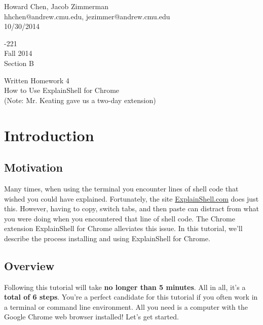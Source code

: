 \documentclass[11pt]{article}
\begin{document}
\thispagestyle{empty}
\noindent
\begin{minipage}[width=0.7\linewidth]{0.7\linewidth}
  Howard Chen, Jacob Zimmerman\\
  hhchen@andrew.cmu.edu, jezimmer@andrew.cmu.edu\\
  10/30/2014
\end{minipage}
\hfill
\begin{minipage}[width=0.3\linewidth]{0.3\linewidth}
  -221\\
  Fall 2014\\
  Section B
\end{minipage}

\begin{center}
  Written Homework 4\\
  How to Use ExplainShell for Chrome\\
  (Note: Mr. Keating gave us a two-day extension)
\end{center}
\newpage

\tableofcontents

\newpage

\section{Introduction}

\subsection{Motivation}
Many times, when using the terminal you encounter lines of shell code that wished you could have explained. Fortunately, the site \href{http://explainshell.com/}{ExplainShell.com} does just this. However, having to copy, switch tabs, and then paste can distract from what you were doing when you encountered that line of shell code. The Chrome extension ExplainShell for Chrome alleviates this issue. In this tutorial, we'll describe the process installing and using ExplainShell for Chrome.


\subsection{Overview}
Following this tutorial will take \textbf{no longer than 5 minutes}. All in all, it's a \textbf{total of 6 steps}. You're a perfect candidate for this tutorial if you often work in a terminal or command line environment. All you need is a computer with the Google Chrome web browser installed! Let's get started.
\end{document}

